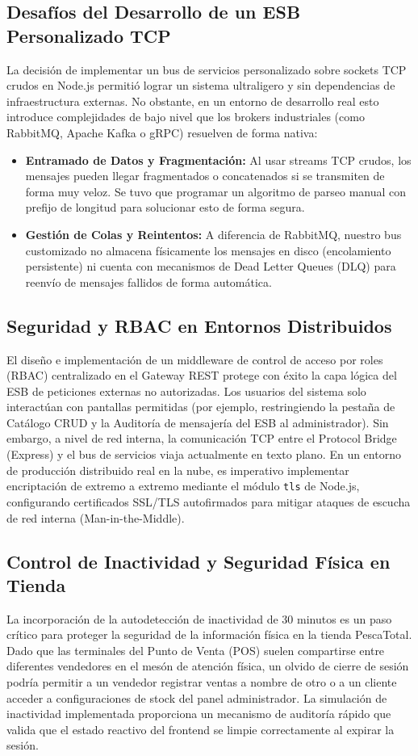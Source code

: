 \documentclass[12pt,a4paper]{article}
\begin{document}
\subsection{Desafíos del Desarrollo de un ESB Personalizado TCP}
La decisión de implementar un bus de servicios personalizado sobre sockets TCP crudos en Node.js permitió lograr un sistema ultraligero y sin dependencias de infraestructura externas. No obstante, en un entorno de desarrollo real esto introduce complejidades de bajo nivel que los brokers industriales (como RabbitMQ, Apache Kafka o gRPC) resuelven de forma nativa:
\begin{itemize}
    \item \textbf{Entramado de Datos y Fragmentación:} Al usar streams TCP crudos, los mensajes pueden llegar fragmentados o concatenados si se transmiten de forma muy veloz. Se tuvo que programar un algoritmo de parseo manual con prefijo de longitud para solucionar esto de forma segura.
    \item \textbf{Gestión de Colas y Reintentos:} A diferencia de RabbitMQ, nuestro bus customizado no almacena físicamente los mensajes en disco (encolamiento persistente) ni cuenta con mecanismos de Dead Letter Queues (DLQ) para reenvío de mensajes fallidos de forma automática.
\end{itemize}

\subsection{Seguridad y RBAC en Entornos Distribuidos}
El diseño e implementación de un middleware de control de acceso por roles (RBAC) centralizado en el Gateway REST protege con éxito la capa lógica del ESB de peticiones externas no autorizadas. Los usuarios del sistema solo interactúan con pantallas permitidas (por ejemplo, restringiendo la pestaña de Catálogo CRUD y la Auditoría de mensajería del ESB al administrador). Sin embargo, a nivel de red interna, la comunicación TCP entre el Protocol Bridge (Express) y el bus de servicios viaja actualmente en texto plano. En un entorno de producción distribuido real en la nube, es imperativo implementar encriptación de extremo a extremo mediante el módulo \texttt{tls} de Node.js, configurando certificados SSL/TLS autofirmados para mitigar ataques de escucha de red interna (Man-in-the-Middle).

\subsection{Control de Inactividad y Seguridad Física en Tienda}
La incorporación de la autodetección de inactividad de 30 minutos es un paso crítico para proteger la seguridad de la información física en la tienda PescaTotal. Dado que las terminales del Punto de Venta (POS) suelen compartirse entre diferentes vendedores en el mesón de atención física, un olvido de cierre de sesión podría permitir a un vendedor registrar ventas a nombre de otro o a un cliente acceder a configuraciones de stock del panel administrador. La simulación de inactividad implementada proporciona un mecanismo de auditoría rápido que valida que el estado reactivo del frontend se limpie correctamente al expirar la sesión.
\end{document}
